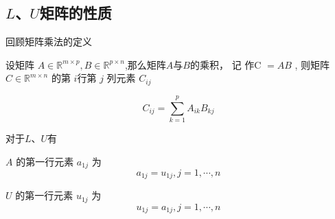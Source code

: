 \subsection{$L$、$U$矩阵的性质}

回顾矩阵乘法的定义

\begin{definition}[矩阵乘法]
    设矩阵 $ A \in \mathbb{R}^{m \times p}, B \in \mathbb{R}^{p \times n} $,那么矩阵$A$与$B$的乘积， 记 作C $ =A B $ ,  则矩阵 $ C \in \mathbb{R}^{m \times n} $ 的第 $i$行第 $ j $ 列元素 $ C_{i j} $


    \begin{equation}
{C}_{i j}=\sum_{k=1}^{p} A_{i k} B_{k j}
\end{equation}
\end{definition}

对于$L$、$U$有

\begin{theorem}
    $ A $ 的第一行元素 $ a_{1 j} $ 为
    \begin{equation}
        a_{1 j}=u_{1 j}, j=1, \cdots, n
    \end{equation}
\end{theorem}

\begin{corollary}
    $ U $ 的第一行元素 $ u_{1 j} $ 为
    \begin{equation}
        u_{1 j}=a_{1 j}, j=1, \cdots, n
    \end{equation}
\end{corollary}

